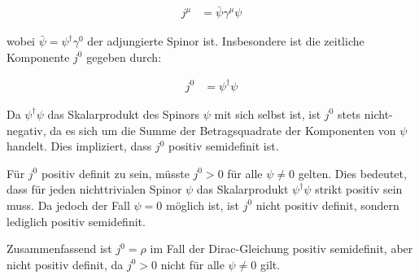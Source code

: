 \documentclass[11pt,a4paper]{article}
\begin{document}
\begin{align*}
j^\mu &= \bar{\psi} \gamma^\mu \psi
\end{align*}

wobei $\bar{\psi} = \psi^\dagger \gamma^0$ der adjungierte Spinor ist. Insbesondere ist die zeitliche Komponente $j^0$ gegeben durch:

\begin{align*}
j^0 &= \psi^\dagger \psi
\end{align*}

Da $\psi^\dagger \psi$ das Skalarprodukt des Spinors $\psi$ mit sich selbst ist, ist $j^0$ stets nicht-negativ, da es sich um die Summe der Betragsquadrate der Komponenten von $\psi$ handelt. Dies impliziert, dass $j^0$ positiv semidefinit ist.

Für $j^0$ positiv definit zu sein, müsste $j^0 > 0$ für alle $\psi \neq 0$ gelten. Dies bedeutet, dass für jeden nichttrivialen Spinor $\psi$ das Skalarprodukt $\psi^\dagger \psi$ strikt positiv sein muss. Da jedoch der Fall $\psi = 0$ möglich ist, ist $j^0$ nicht positiv definit, sondern lediglich positiv semidefinit.

Zusammenfassend ist $j^0 = \rho$ im Fall der Dirac-Gleichung positiv semidefinit, aber nicht positiv definit, da $j^0 > 0$ nicht für alle $\psi \neq 0$ gilt.

\end{document}
